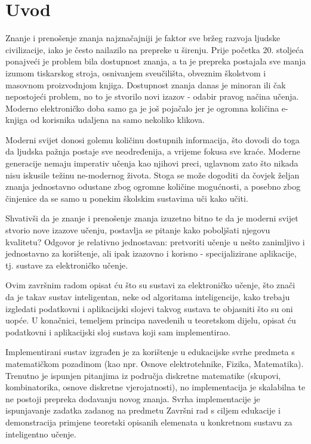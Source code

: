\documentclass[times, utf8, zavrsni, numeric]{fer}
\begin{document}
\chapter{Uvod}
Znanje i prenošenje znanja najznačajniji je faktor sve bržeg razvoja ljudske civilizacije, iako je često nailazilo na prepreke u širenju. Prije početka 20. stoljeća ponajveći je problem bila dostupnost znanja, a ta je prepreka postajala sve manja izumom tiskarskog stroja, osnivanjem sveučilišta, obveznim školstvom i masovnom proizvodnjom knjiga. Dostupnost znanja danas je minoran ili čak nepostojeći problem, no to je stvorilo novi izazov - odabir pravog načina učenja. Moderno elektroničko doba samo ga je još pojačalo jer je ogromna količina e-knjiga od korisnika udaljena na samo nekoliko klikova.
\par
Moderni svijet donosi golemu količinu dostupnih informacija, što dovodi do toga da ljudska pažnja postaje sve neodređenija, a vrijeme fokusa sve kraće. Moderne generacije nemaju imperativ učenja kao njihovi preci, uglavnom zato što nikada nisu iskusile težinu ne-modernog života. Stoga se može dogoditi da čovjek željan znanja jednostavno odustane zbog ogromne količine mogućnosti, a posebno zbog činjenice da se samo u ponekim školskim sustavima uči kako učiti.
\par
Shvativši da je znanje i prenošenje znanja izuzetno bitno te da je moderni svijet stvorio nove izazove učenju, postavlja se pitanje kako poboljšati njegovu kvalitetu? Odgovor je relativno jednostavan: pretvoriti učenje u nešto zanimljivo i jednostavno za korištenje, ali ipak izazovno i korisno - specijalizirane aplikacije, tj. sustave za elektroničko učenje.
\par
Ovim završnim radom opisat ću što su sustavi za elektroničko učenje, što znači da je takav sustav inteligentan, neke od algoritama inteligencije, kako trebaju izgledati podatkovni i aplikacijski slojevi takvog sustava te objasniti što su oni uopće. U konačnici, temeljem principa navedenih u teoretskom dijelu, opisat ću podatkovni i aplikacijski sloj sustava koji sam implementirao.
\par
Implementirani sustav izgrađen je za korištenje u edukacijske svrhe predmeta s matematičkom pozadinom (kao npr. Osnove elektrotehnike, Fizika, Matematika). Trenutno je ispunjen pitanjima iz područja diskretne matematike (skupovi, kombinatorika, osnove diskretne vjerojatnosti), no implementacija je skalabilna te ne postoji prepreka dodavanju novog znanja. Svrha implementacije je ispunjavanje zadatka zadanog na predmetu Završni rad s ciljem edukacije i demonstracija primjene teoretski opisanih elemenata u konkretnom sustavu za inteligentno učenje.
\end{document}
